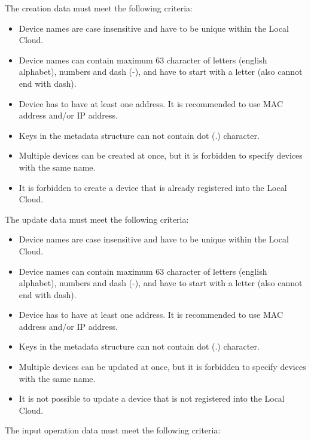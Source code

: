 \documentclass[a4paper]{arrowhead}
\begin{document}
The creation data must meet the following criteria:

\begin{itemize}
    \item Device names are case insensitive and have to be unique within the Local Cloud.
    \item Device names can contain maximum 63 character of letters (english alphabet), numbers and dash (-), and have to start with a letter (also cannot end with dash).
    \item Device has to have at least one address. It is recommended to use MAC address and/or IP address.
    \item Keys in the metadata structure can not contain dot (.) character.
    \item Multiple devices can be created at once, but it is forbidden to specify devices with the same name.
    \item It is forbidden to create a device that is already registered into the Local Cloud.
\end{itemize}


The update data must meet the following criteria:

\begin{itemize}
    \item Device names are case insensitive and have to be unique within the Local Cloud.
    \item Device names can contain maximum 63 character of letters (english alphabet), numbers and dash (-), and have to start with a letter (also cannot end with dash).
    \item Device has to have at least one address. It is recommended to use MAC address and/or IP address.
    \item Keys in the metadata structure can not contain dot (.) character.
    \item Multiple devices can be updated at once, but it is forbidden to specify devices with the same name.
    \item It is not possible to update a device that is not registered into the Local Cloud.
\end{itemize}


The input operation data must meet the following criteria:
\end{document}
